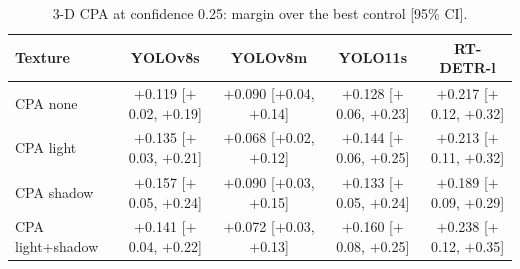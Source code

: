 \begin{table}[htbp]\centering\scriptsize
\caption{3-D CPA at confidence 0.25: margin over the best control [95\% CI].}\label{tab:a-025}
\setlength{\tabcolsep}{3pt}
\begin{tabular}{@{}lcccc@{}}
\toprule
Texture & YOLOv8s & YOLOv8m & YOLO11s & RT-DETR-l\\
\midrule
CPA none & $+$0.119 [$+$0.02, $+$0.19] & $+$0.090 [$+$0.04, $+$0.14] & $+$0.128 [$+$0.06, $+$0.23] & $+$0.217 [$+$0.12, $+$0.32]\\
CPA light & $+$0.135 [$+$0.03, $+$0.21] & $+$0.068 [$+$0.02, $+$0.12] & $+$0.144 [$+$0.06, $+$0.25] & $+$0.213 [$+$0.11, $+$0.32]\\
CPA shadow & $+$0.157 [$+$0.05, $+$0.24] & $+$0.090 [$+$0.03, $+$0.15] & $+$0.133 [$+$0.05, $+$0.24] & $+$0.189 [$+$0.09, $+$0.29]\\
CPA light+shadow & $+$0.141 [$+$0.04, $+$0.22] & $+$0.072 [$+$0.03, $+$0.13] & $+$0.160 [$+$0.08, $+$0.25] & $+$0.238 [$+$0.12, $+$0.35]\\
\bottomrule
\end{tabular}
\end{table}

